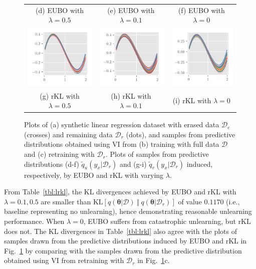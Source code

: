 \documentclass{article}
\theoremstyle{definition}
\newcommand{\mcl}[1]{\mathcal{#1}}
\newcommand{\da}{\mcl{D}}
\newcommand{\dc}{\mcl{D}_r}
\newcommand{\dr}{\mcl{D}_e}
\newcommand{\eubo}{\tilde{q}_u}
\newcommand{\elbo}{\tilde{q}_v}
\begin{document}
\begin{figure}
\begin{tabular}{ccc}
\\
(d) EUBO with $\lambda = 0.5$
&
(e) EUBO with $\lambda = 0.1$
&
(f) EUBO with $\lambda = 0$
\\
\includegraphics[height=0.2\textwidth]{img/linear_regression/linear_regression_gauss_diag_elbo_0_5}
&
\includegraphics[height=0.2\textwidth]{img/linear_regression/linear_regression_gauss_diag_elbo_0_1}
&
\includegraphics[height=0.2\textwidth]{img/linear_regression/linear_regression_gauss_diag_elbo_0_0}
\\
(g) rKL with $\lambda = 0.5$
&
(h) rKL with $\lambda = 0.1$
&
(i) rKL with $\lambda = 0$
\end{tabular}
\caption{Plots of (a) synthetic linear regression dataset with erased data $\dr$ (crosses) and remaining data $\dc$ (dots), and samples from predictive distributions obtained using VI from (b) training with full data $\da$ and (c) retraining with $\dc$. Plots of samples from predictive distributions (d-f) $\eubo(y_x|\dc)$ and (g-i) $\elbo(y_x|\dc)$ induced, respectively, by EUBO and rKL with varying $\lambda$.}
\label{fig:lrkl}
\end{figure}

From Table~\ref{tbl:lrkl}, the KL divergences achieved by EUBO and rKL with $\lambda =0.1, 0.5$ are smaller than $\text{KL}[q(\bm{\theta}|\da)\ \Vert\ q(\bm{\theta}|\dc)]$ of value $0.1170$ (i.e., baseline representing no unlearning), hence demonstrating reasonable unlearning performance.
When $\lambda = 0$, EUBO suffers from catastrophic unlearning, but rKL does not.
The KL divergences in Table~\ref{tbl:lrkl} also agree with the plots of samples drawn from the predictive distributions induced by EUBO and rKL in Fig.~\ref{fig:lrkl} by comparing with the samples drawn from the predictive distribution obtained using VI from retraining with $\dc$ in Fig.~\ref{fig:lrkl}c.
%
\end{document}
